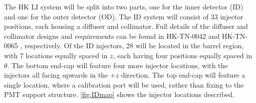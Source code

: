 \documentclass[a4paper,11pt]{article}
\providecommand{\DIFdelbeginFL}{} %
\newcommand{\DIFscaledelfig}{0.5}
\newlength{\DIFdelgraphicswidth} %
\newlength{\DIFdelgraphicsheight} %
\newcommand{\DIFdelincludegraphics}[2][]{%
\sbox{\DIFdelgraphicsbox}{\DIFOincludegraphics[#1]{#2}}%
\settoboxwidth{\DIFdelgraphicswidth}{\DIFdelgraphicsbox} %
\settoboxtotalheight{\DIFdelgraphicsheight}{\DIFdelgraphicsbox} %
\scalebox{\DIFscaledelfig}{%
\parbox[b]{\DIFdelgraphicswidth}{\usebox{\DIFdelgraphicsbox}\\[-\baselineskip] \rule{\DIFdelgraphicswidth}{0em}}\llap{\resizebox{\DIFdelgraphicswidth}{\DIFdelgraphicsheight}{%
\setlength{\unitlength}{\DIFdelgraphicswidth}%
\begin{picture}(1,1)%
\thicklines\linethickness{2pt} %
{\color[rgb]{1,0,0}\put(0,0){\framebox(1,1){}}}%
{\color[rgb]{1,0,0}\put(0,0){\line( 1,1){1}}}%
{\color[rgb]{1,0,0}\put(0,1){\line(1,-1){1}}}%
\end{picture}%
}\hspace*{3pt}}} %
} %
\DeclareRobustCommand{\DIFdelbeginFL}{\DIFOdelbeginFL \let\includegraphics\DIFdelincludegraphics} %
\begin{document}
The HK LI system will be split into two parts, one for the inner detector (ID) and one for the outer detector (OD). The ID system will consist of 33 injector positions, each housing a diffuser and collimator. Full details of the diffuser and collimator designs and requirements can be found in HK-TN-0042 \cite{bib:tn0042} and HK-TN-0065 \cite{bib:tn0065}, respectively. Of the ID injectors, 28 will be located in the barrel region, with 7 locations equally spaced in $z$, each having four positions equally spaced in $\theta$. The bottom end-cap will feature four more injector locations, with the injectors all facing upwards in the $+z$ direction. The top end-cap will feature a single location, where a calibration port will be used, rather than fixing to the PMT support structure. \cref{fig:IDmap} shows the injector locations described.
\begin{figure}[h]
\centering
\DIFdelbeginFL %

\end{figure}
\end{document}
